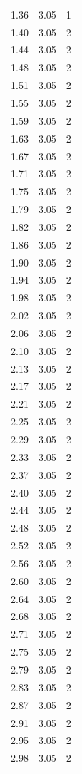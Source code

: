 \begin{longtable}{lrr}
  1.36 & 3.05 & 1 \\
  1.40 & 3.05 & 2 \\
  1.44 & 3.05 & 2 \\
  1.48 & 3.05 & 2 \\
  1.51 & 3.05 & 2 \\
  1.55 & 3.05 & 2 \\
  1.59 & 3.05 & 2 \\
  1.63 & 3.05 & 2 \\
  1.67 & 3.05 & 2 \\
  1.71 & 3.05 & 2 \\
  1.75 & 3.05 & 2 \\
  1.79 & 3.05 & 2 \\
  1.82 & 3.05 & 2 \\
  1.86 & 3.05 & 2 \\
  1.90 & 3.05 & 2 \\
  1.94 & 3.05 & 2 \\
  1.98 & 3.05 & 2 \\
  2.02 & 3.05 & 2 \\
  2.06 & 3.05 & 2 \\
  2.10 & 3.05 & 2 \\
  2.13 & 3.05 & 2 \\
  2.17 & 3.05 & 2 \\
  2.21 & 3.05 & 2 \\
  2.25 & 3.05 & 2 \\
  2.29 & 3.05 & 2 \\
  2.33 & 3.05 & 2 \\
  2.37 & 3.05 & 2 \\
  2.40 & 3.05 & 2 \\
  2.44 & 3.05 & 2 \\
  2.48 & 3.05 & 2 \\
  2.52 & 3.05 & 2 \\
  2.56 & 3.05 & 2 \\
  2.60 & 3.05 & 2 \\
  2.64 & 3.05 & 2 \\
  2.68 & 3.05 & 2 \\
  2.71 & 3.05 & 2 \\
  2.75 & 3.05 & 2 \\
  2.79 & 3.05 & 2 \\
  2.83 & 3.05 & 2 \\
  2.87 & 3.05 & 2 \\
  2.91 & 3.05 & 2 \\
  2.95 & 3.05 & 2 \\
  2.98 & 3.05 & 2 \\

\end{longtable}
